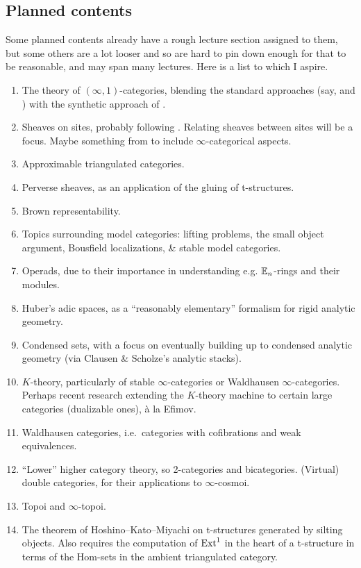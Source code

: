 \documentclass[a4paper, 11pt]{article}
\newcommand{\1}{\ensuremath{\mathbb{1}}}
\newcommand{\2}{\ensuremath{\mathbb{2}}}
\newcommand{\3}{\ensuremath{\mathbb{3}}}
\begin{document}
\subsection{Planned contents}
Some planned contents already have a rough lecture section assigned to them, but some others are a lot looser and so are hard to pin down enough for that to be reasonable, and may span many lectures.
Here is a list to which I aspire.
\begin{enumerate}[label=(\arabic*)]
\item The theory of \((\infty,1)\)-categories, blending the standard approaches (say, \cite{lurie-htt} and \cite{cisinski-book}) with the synthetic approach of \cite{riehl-verity-elements}.
\item Sheaves on sites, probably following \cite{kashiwara-schapira-book}. Relating sheaves between sites will be a focus. Maybe something from \cite{lurie-htt} to include \(\infty\)-categorical aspects.
\item Approximable triangulated categories.
\item Perverse sheaves, as an application of the gluing of t-structures.
\item Brown representability.
\item Topics surrounding model categories: lifting problems, the small object argument, Bousfield localizations, \& stable model categories.
\item Operads, due to their importance in understanding e.g. \(\mathbb{E}_n\)-rings and their modules.
\item Huber's adic spaces, as a ``reasonably elementary'' formalism for rigid analytic geometry.
\item Condensed sets, with a focus on eventually building up to condensed analytic geometry (via Clausen \& Scholze's analytic stacks).
\item \(K\)-theory, particularly of stable \(\infty\)-categories or Waldhausen \(\infty\)-categories. Perhaps recent research extending the \(K\)-theory machine to certain large categories (dualizable ones), à la Efimov.
\item Waldhausen categories, i.e.\ categories with cofibrations and weak equivalences.
\item ``Lower'' higher category theory, so 2-categories and bicategories. (Virtual) double categories, for their applications to \(\infty\)-cosmoi.
\item Topoi and \(\infty\)-topoi.
\item The theorem of Hoshino--Kato--Miyachi on t-structures generated by silting objects. Also requires the computation of \(\operatorname{Ext}^1\) in the heart of a t-structure
in terms of the Hom-sets in the ambient triangulated category.
\end{enumerate}
\end{document}

